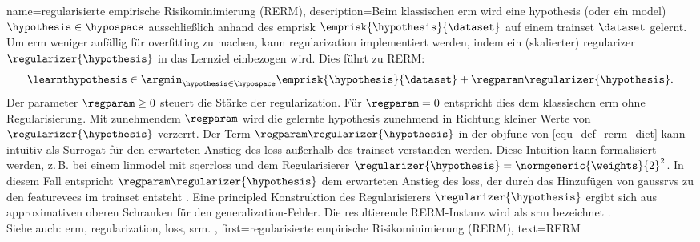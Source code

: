{{{{
{name={regularisierte empirische Risikominimierung (RERM)}, 
 description={Beim klassischen \gls{erm} wird eine \gls{hypothesis} (oder ein \gls{model}) $\hypothesis \in \hypospace$ 
  ausschließlich anhand des \gls{emprisk} $\emprisk{\hypothesis}{\dataset}$ auf einem \gls{trainset} $\dataset$ gelernt. 
  Um \gls{erm} weniger anfällig für \gls{overfitting} zu machen, kann \gls{regularization} implementiert werden, 
  indem ein (skalierter) \gls{regularizer} $\regularizer{\hypothesis}$ in das Lernziel einbezogen wird. 
  Dies führt zu RERM:
  \begin{equation}
   \label{equ_def_rerm_dict}
   \learnthypothesis \in \argmin_{\hypothesis \in \hypospace} \emprisk{\hypothesis}{\dataset} + \regparam \regularizer{\hypothesis}.
  \end{equation}
  Der \gls{parameter} $\regparam \geq 0$ steuert die Stärke der \gls{regularization}. Für $\regparam = 0$ 
  entspricht dies dem klassischen \gls{erm} ohne Regularisierung. Mit zunehmendem $\regparam$ wird die 
  gelernte \gls{hypothesis} zunehmend in Richtung kleiner Werte von $\regularizer{\hypothesis}$ verzerrt. 
  Der Term $\regparam \regularizer{\hypothesis}$ in der \gls{objfunc} von \eqref{equ_def_rerm_dict} 
  kann intuitiv als Surrogat für den erwarteten Anstieg des \gls{loss} außerhalb des \gls{trainset} 
  verstanden werden. Diese Intuition kann formalisiert werden, z.\,B. bei einem \gls{linmodel} mit \gls{sqerrloss} 
  und dem Regularisierer $\regularizer{\hypothesis} = \normgeneric{\weights}{2}^{2}$. 
  In diesem Fall entspricht $\regparam \regularizer{\hypothesis}$ dem erwarteten Anstieg des \gls{loss}, 
  der durch das Hinzufügen von \glspl{gaussrv} zu den \glspl{featurevec} im \gls{trainset} entsteht 
  \cite[Kap. 3]{MLBasics}. 
  Eine principled Konstruktion des Regularisierers $\regularizer{\hypothesis}$ ergibt sich aus 
  approximativen oberen Schranken für den \gls{generalization}-Fehler. Die resultierende RERM-Instanz 
  wird als \gls{srm} bezeichnet \cite[Abschnitt 7.2]{ShalevShwartz2009}.
   \\
  Siehe auch: \gls{erm}, \gls{regularization}, \gls{loss}, \gls{srm}. },
 first={regularisierte empirische Risikominimierung (RERM)},
 text={RERM}
}

}}}}
